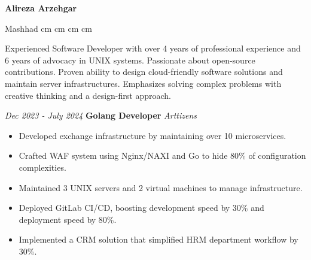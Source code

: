 \documentclass{engineercv}
\begin{document}
\begin{center}
  \textbf{\fontsize{24 pt}{24 pt}\selectfont Alireza Arzehgar}

  \vspace{0.2 cm}

  \scriptsize
  \mbox{{\color{black}\footnotesize\faMapMarker*}\hspace*{0.13cm}Mashhad}
   cm
  \mbox{}
   cm
  \mbox{}
   cm
  \mbox{}
   cm
  \mbox{}
\end{center}


Experienced Software Developer with over 4 years of professional experience and 6 years of advocacy in UNIX systems.
Passionate about open-source contributions. Proven ability to design cloud-friendly software solutions and
maintain server infrastructures. Emphasizes solving complex problems with creative thinking
and a design-first approach.


\begin{twocolentry}{\textit{Dec 2023 - July 2024}}
  \textbf{Golang Developer}
  \textit{Arttizens}
\end{twocolentry}

\begin{itemize}
  \item Developed exchange infrastructure by maintaining over 10 microservices.
  \item Crafted WAF system using Nginx/NAXI and Go to hide 80\% of configuration complexities.
  \item Maintained 3 UNIX servers and 2 virtual machines to manage infrastructure.
  \item Deployed GitLab CI/CD, boosting development speed by 30\% and deployment speed by 80\%.
  \item Implemented a CRM solution that simplified HRM department workflow by 30\%.
\end{itemize}
\end{document}
